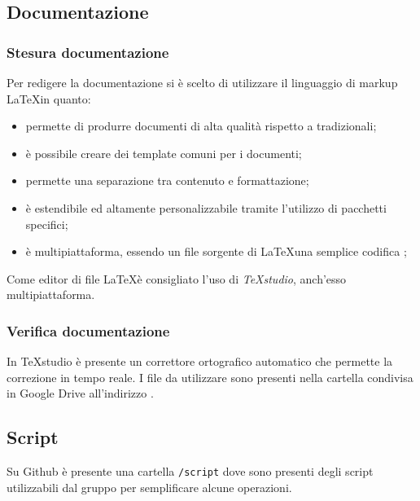 	\subsection{Documentazione}
		\subsubsection{Stesura documentazione}
		Per redigere la documentazione si è scelto di utilizzare il linguaggio di markup \LaTeX in quanto: \\
		\begin{itemize} 
			\item permette di produrre documenti di alta qualità rispetto a  tradizionali; 
			\item è possibile creare dei template comuni per i documenti;
			\item permette una separazione tra contenuto e formattazione;
			\item è estendibile ed altamente personalizzabile tramite l'utilizzo di pacchetti specifici;
			\item è multipiattaforma, essendo un file sorgente di \LaTeX una semplice codifica ;
		\end{itemize}
		Come editor di file \LaTeX è consigliato l'uso di \textit{TeXstudio}, anch'esso multipiattaforma.
		\subsubsection{Verifica documentazione}
			In TeXstudio è presente un correttore ortografico automatico che permette la correzione in tempo reale. I file da utilizzare sono presenti nella cartella condivisa in Google Drive all'indirizzo .
	\subsection{Script}
	Su Github è presente una cartella \texttt{/script} dove sono presenti degli script utilizzabili dal gruppo per semplificare alcune operazioni.